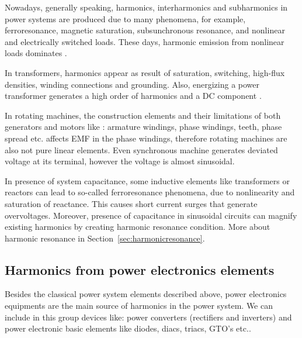 \documentclass[12pt]{report} %
\begin{document}
Nowadays, generally speaking, harmonics, interharmonics and subharmonics in power systems are produced due to many phenomena, for example, ferroresonance, magnetic saturation, subsunchronous resonance, and nonlinear and electrically switched loads. These days, harmonic emission from nonlinear loads dominates \cite{arrillaga}. 

In transformers, harmonics appear as result of saturation, switching, high-flux densities, winding connections and grounding. Also, energizing a power transformer generates a high order of harmonics and a DC component \cite{das}.

In rotating machines, the construction elements and their limitations of both generators and motors like \cite{das}: armature windings, phase windings, teeth, phase spread etc. affects EMF in the phase windings, therefore rotating machines are also not pure linear elements. Even synchronous machine generates deviated voltage at its terminal, however the voltage is almost sinusoidal.

In presence of system capacitance, some inductive elements like transformers or reactors can lead to so-called ferroresonance phenomena, due to nonlinearity and saturation of reactance. This causes short current surges that generate overvoltages. Moreover, presence of capacitance in sinusoidal circuits can magnify existing harmonics by creating harmonic resonance condition. More about harmonic resonance in Section~\ref{sec:harmonicresonance}.

\subsection{Harmonics from power electronics elements}
Besides the classical power system elements described above, power electronics equipments are the main source of harmonics in the power system. We can include in this group devices like: power converters (rectifiers and inverters) and power electronic basic elements like diodes, diacs, triacs, GTO’s etc.\cite{das}.
\end{document}
